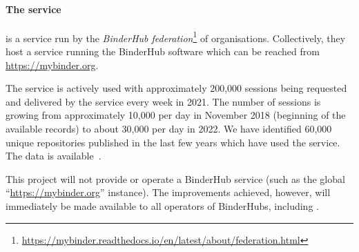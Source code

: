 \paragraph{The \mybinder{} service}\label{sec:mybinder}

\emph{\mybinder{}} is a service run by the \emph{BinderHub
  federation}\footnote{\url{https://mybinder.readthedocs.io/en/latest/about/federation.html}}
of organisations. Collectively, they host a service running the BinderHub software
which can be reached from \url{https://mybinder.org}.

The service is actively used with approximately 200,000 sessions being
requested and delivered by the \mybinder{} service every week in 2021. The number
of sessions is growing from approximately 10,000 per day in November 2018
(beginning of the available records) to about 30,000 per day in 2022. We have
identified 60,000 unique repositories published in the last few years which have
used the \mybinder{} service. The data is available~\cite{mybinder-archive}.

This \TheProject{} project will not provide or operate a BinderHub service (such as the global
``\url{https://mybinder.org}'' instance). The improvements achieved, however, will immediately
be made available to all operators of BinderHubs, including \mybinder{}.






